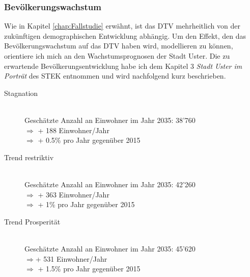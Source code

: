 %
%
%
%


\subsubsection*{Bevölkerungswachstum}
\label{subsubsec:Bevölkerung}

Wie in Kapitel \ref{chap:Fallstudie} erwähnt, ist das DTV mehrheitlich von der zukünftigen demographischen Entwicklung abhängig.
Um den Effekt, den das Bevölkerungswachstum auf das DTV haben wird, modellieren zu können, orientiere ich mich an den Wachstumsprognosen der Stadt Uster.
Die zu erwartende Bevölkerungsentwicklung habe ich dem Kapitel 3 \textit{Stadt Uster im Porträt} des STEK entnommen und wird nachfolgend kurz beschrieben. 

\begin{description}
\item[Stagnation] \hfill \\
Geschätzte Anzahl an Einwohner im Jahr 2035: 38'760 \\
$\Rightarrow$ + 188 Einwohner/Jahr \\ $\Rightarrow$ + 0.5\% pro Jahr gegenüber 2015
\item[Trend restriktiv] \hfill \\
Geschätzte Anzahl an Einwohner im Jahr 2035: 42'260 \\ 
$\Rightarrow$ + 363 Einwohner/Jahr \\ $\Rightarrow$ + 1\% pro Jahr gegenüber 2015
\item[Trend Prosperität] \hfill \\
Geschätzte Anzahl an Einwohner im Jahr 2035: 45'620 \\ 
$\Rightarrow$+ 531 Einwohner/Jahr \\ $\Rightarrow$ + 1.5\% pro Jahr gegenüber 2015
\end{description}

